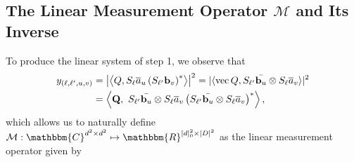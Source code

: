 
\subsection{The Linear Measurement Operator $\mathcal{M}$ and Its Inverse}
\label{sec:linear}
To produce the linear system of step 1, we observe that
\begin{align*}%
y_{(\ell,\ell',u,v)} &= \left| \left\langle Q, S_{\ell} \a_u \left(S_{\ell'} \b_v \right)^* \right\rangle \right|^2 = |\langle \vec{Q}, S_{\ell'} \bar{\b_u} \otimes S_{\ell} \a_v \rangle |^2 \\%
&= \left\langle  \mathbf{Q}, ~S_{\ell'} \bar{\b_u} \otimes S_{\ell} \a_v \left(S_{\ell'} \bar{\b_u} \otimes S_{\ell} \a_v\right)^* \right\rangle,
\end{align*} %
which allows us to naturally define $\mathcal{M}: \mathbbm{C}^{d^2 \times d^2} \mapsto \mathbbm{R}^{[d]_0^2 \times [D]^2}$ as the linear measurement operator given by 
